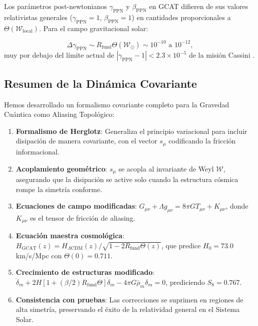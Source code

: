 \documentclass[12pt, a4paper]{article}
\theoremstyle{plain}
\theoremstyle{definition}
\begin{document}
Los parámetros post-newtonianos $\gamma_{\text{PPN}}$ y $\beta_{\text{PPN}}$ en GCAT difieren de sus valores relativistas generales ($\gamma_{\text{PPN}}=1$, $\beta_{\text{PPN}}=1$) en cantidades proporcionales a $\Theta(\mathcal{W}_{\text{local}})$. Para el campo gravitacional solar:

\begin{equation}
\Delta\gamma_{\text{PPN}} \sim R_{\text{fund}} \Theta(\mathcal{W}_{\odot}) \sim 10^{-10} \text{ a } 10^{-12},
\end{equation}
muy por debajo del límite actual de $|\gamma_{\text{PPN}}-1| < 2.3\times10^{-5}$ de la misión Cassini \cite{Bertotti2003}.

\subsection{Resumen de la Dinámica Covariante}

Hemos desarrollado un formalismo covariante completo para la Gravedad Cuántica como Aliasing Topológico:

\begin{enumerate}
    \item \textbf{Formalismo de Herglotz}: Generaliza el principio variacional para incluir disipación de manera covariante, con el vector $s_\mu$ codificando la fricción informacional.
    
    \item \textbf{Acoplamiento geométrico}: $s_\mu$ se acopla al invariante de Weyl $\mathcal{W}$, asegurando que la disipación se active solo cuando la estructura cósmica rompe la simetría conforme.
    
    \item \textbf{Ecuaciones de campo modificadas}: $G_{\mu\nu} + \Lambda g_{\mu\nu} = 8\pi G T_{\mu\nu} + K_{\mu\nu}$, donde $K_{\mu\nu}$ es el tensor de fricción de aliasing.
    
    \item \textbf{Ecuación maestra cosmológica}: $H_{\text{GCAT}}(z) = H_{\Lambda\text{CDM}}(z)/\sqrt{1 - 2R_{\text{fund}}\Theta(z)}$, que predice $H_0 = 73.0$ km/s/Mpc con $\Theta(0)=0.711$.
    
    \item \textbf{Crecimiento de estructuras modificado}: $\ddot{\delta}_m + 2H[1+(\beta/2)R_{\text{fund}}\Theta]\dot{\delta}_m - 4\pi G\bar{\rho}_m\delta_m = 0$, prediciendo $S_8 = 0.767$.
    
    \item \textbf{Consistencia con pruebas}: Las correcciones se suprimen en regiones de alta simetría, preservando el éxito de la relatividad general en el Sistema Solar.
\end{enumerate}
\end{document}
